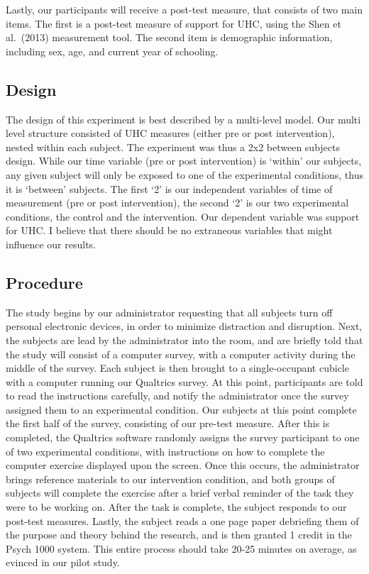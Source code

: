 \documentclass[
]{article}
\begin{document}
Lastly, our participants will receive a post-test measure, that consists
of two main items. The first is a post-test measure of support for UHC,
using the Shen et al.~(2013) measurement tool. The second item is
demographic information, including sex, age, and current year of
schooling.

\hypertarget{design-1}{%
\subsection{Design}\label{design-1}}

The design of this experiment is best described by a multi-level model.
Our multi level structure consisted of UHC measures (either pre or post
intervention), nested within each subject. The experiment was thus a 2x2
between subjects design. While our time variable (pre or post
intervention) is `within' our subjects, any given subject will only be
exposed to one of the experimental conditions, thus it is `between'
subjects. The first `2' is our independent variables of time of
measurement (pre or post intervention), the second `2' is our two
experimental conditions, the control and the intervention. Our dependent
variable was support for UHC. I believe that there should be no
extraneous variables that might influence our results.

\hypertarget{procedure-1}{%
\subsection{Procedure}\label{procedure-1}}

The study begins by our administrator requesting that all subjects turn
off personal electronic devices, in order to minimize distraction and
disruption. Next, the subjects are lead by the administrator into the
room, and are briefly told that the study will consist of a computer
survey, with a computer activity during the middle of the survey. Each
subject is then brought to a single-occupant cubicle with a computer
running our Qualtrics survey. At this point, participants are told to
read the instructions carefully, and notify the administrator once the
survey assigned them to an experimental condition. Our subjects at this
point complete the first half of the survey, consisting of our pre-test
measure. After this is completed, the Qualtrics software randomly
assigns the survey participant to one of two experimental conditions,
with instructions on how to complete the computer exercise displayed
upon the screen. Once this occurs, the administrator brings reference
materials to our intervention condition, and both groups of subjects
will complete the exercise after a brief verbal reminder of the task
they were to be working on. After the task is complete, the subject
responds to our post-test measures. Lastly, the subject reads a one page
paper debriefing them of the purpose and theory behind the research, and
is then granted 1 credit in the Psych 1000 system. This entire process
should take 20-25 minutes on average, as evinced in our pilot study.
\end{document}
